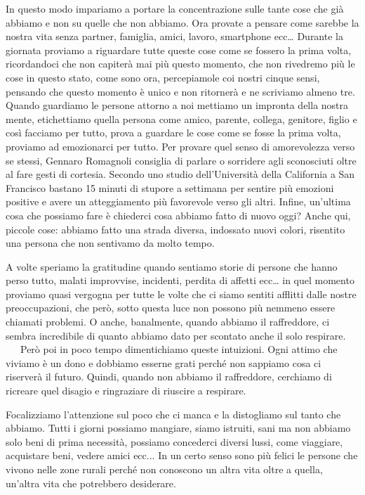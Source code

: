 \documentclass[12pt]{book} %
\begin{document}
In questo modo impariamo a portare la concentrazione sulle tante cose che già abbiamo e non su quelle che non abbiamo.
Ora provate a pensare come sarebbe la nostra vita senza partner, famiglia, amici, lavoro, smartphone ecc… Durante la
giornata proviamo a riguardare tutte queste cose come se fossero la prima volta, ricordandoci che non capiterà mai più
questo momento, che non rivedremo più le cose in questo stato, come sono ora, percepiamole coi nostri cinque sensi,
pensando che questo momento è unico e non ritornerà e ne scriviamo almeno tre. Quando guardiamo le persone attorno a
noi mettiamo un impronta della nostra mente, etichettiamo quella persona come amico, parente, collega, genitore, figlio
e così facciamo per tutto, prova a guardare le cose come se fosse la prima volta, proviamo ad emozionarci per tutto.
Per provare quel senso di amorevolezza verso se stessi, Gennaro Romagnoli consiglia di parlare o sorridere agli
sconosciuti oltre al fare gesti di cortesia. Secondo uno studio dell'Università della California a San Francisco
bastano 15 minuti di {\textquotedbl}stupore{\textquotedbl} a settimana per sentire più emozioni positive e avere un
atteggiamento più favorevole verso gli altri. Infine, un'ultima cosa che possiamo fare è chiederci
cosa abbiamo fatto di nuovo oggi? Anche qui, piccole cose: abbiamo fatto una strada diversa, indossato nuovi colori,
risentito una persona che non sentivamo da molto tempo. 

A volte speriamo la gratitudine quando sentiamo storie di persone che hanno perso tutto, malati improvvise, incidenti,
perdita di affetti ecc… in quel momento proviamo quasi vergogna per tutte le volte che ci siamo sentiti afflitti dalle
nostre preoccupazioni, che però, sotto questa luce non possono più nemmeno essere chiamati problemi. O anche,
banalmente, quando abbiamo il raffreddore, ci sembra incredibile di quanto abbiamo dato per scontato anche il solo
respirare. \ \ \ Però poi in poco tempo dimentichiamo queste intuizioni. Ogni attimo che viviamo è un dono e dobbiamo
esserne grati perché non sappiamo cosa ci riserverà il futuro. Quindi, quando non abbiamo il raffreddore, cerchiamo di
ricreare quel disagio e ringraziare di riuscire a respirare.

Focalizziamo l'attenzione sul poco che ci manca e la distogliamo sul tanto che abbiamo. Tutti i
giorni possiamo mangiare, siamo istruiti, sani ma non abbiamo solo beni di prima necessità, possiamo concederci diversi
lussi, come viaggiare, acquistare beni, vedere amici ecc... \newline
In un certo senso sono più felici le persone che vivono nelle zone rurali perché non conoscono un altra vita oltre a
quella, un'altra vita che potrebbero desiderare.
\end{document}
